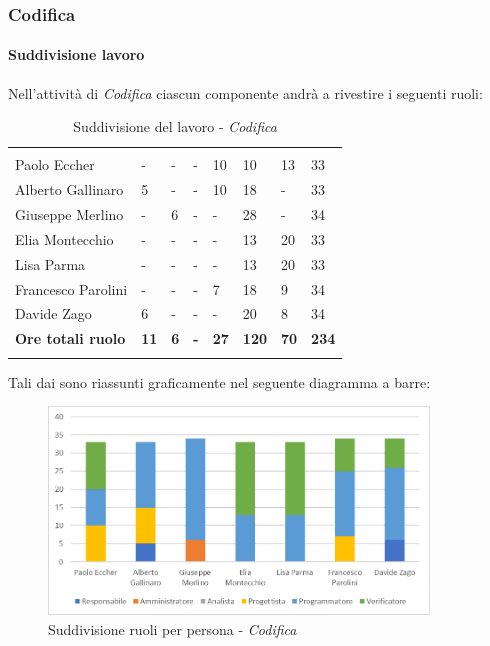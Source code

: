 		
		\subsubsection{Codifica}
			\paragraph{Suddivisione lavoro} \Spazio
			Nell'attività di \textit{Codifica} ciascun componente andrà a rivestire i seguenti ruoli:
			\begin{table}[H]
				\centering
				\begin{tabular}{|C{4cm}|C{0.8cm}|C{0.8cm}|C{0.8cm}|C{0.8cm}|C{0.8cm}|C{0.8cm}|C{3cm}|}
					 & & &&&&&\\
					Paolo Eccher      & - & - & - & 10 & 10 & 13 & 33 \\
					\hline
					Alberto Gallinaro & 5 & - & - & 10 & 18 & - & 33 \\
					\hline
					Giuseppe Merlino  & - & 6 & - & - & 28 & - & 34 \\
					\hline
					Elia Montecchio   & - & - & - & - & 13 & 20 & 33 \\
					\hline
					Lisa Parma        & - & - & - & - & 13 & 20 & 33 \\
					\hline
					Francesco Parolini& - & - & - & 7 & 18 & 9 & 34 \\
					\hline
					Davide Zago       & 6 & - & - & - & 20 & 8 & 34 \\
					\hline
					\textbf{Ore totali ruolo}  & \textbf{11} & \textbf{6} & \textbf{-} & \textbf{27} & \textbf{120} & \textbf{70} & \textbf{234} \\
				\end{tabular}
				\caption{Suddivisione del lavoro - \textit{Codifica}}
			\end{table}
			
			Tali dai sono riassunti graficamente nel seguente diagramma a barre:
			
			\begin{figure}[H] 
				\centering 
				\includegraphics[width=0.9\textwidth]{images/BarreCodifica.png} 
				\caption{Suddivisione ruoli per persona - \textit{Codifica}}
				\label{BarreCodifica}
			\end{figure}
			
